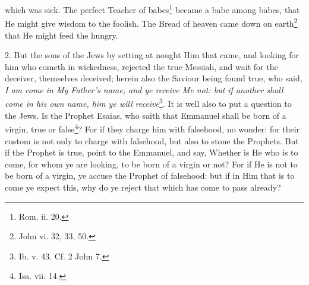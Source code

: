 which was sick. The perfect Teacher of babes\footnote{Rom. ii. 20.} became a babe among babes, that He might give wisdom to the foolish. The Bread of heaven came down on earth\footnote{John vi. 32, 33, 50.} that He might feed the hungry.

2. But the sons of the Jews by setting at nought Him that came, and looking for him who cometh in wickedness, rejected the true Messiah, and wait for the deceiver, themselves deceived; herein also the Saviour being found true, who said, \emph{I am come in My Father’s name, and ye receive Me not: but if another shall come in his own name, him ye will receive}\footnote{Ib. v. 43. Cf. 2 John 7.}. It is well also to put a question to the Jews. Is the Prophet Esaias, who saith that Emmanuel shall be born of a virgin, true or false\footnote{Isa. vii. 14.}? For if they charge him with falsehood, no wonder: for their custom is not only to charge with falsehood, but also to stone the Prophets. But if the Prophet is true, point to the Emmanuel, and say, Whether is He who is to come, for whom ye are looking, to be born of a virgin or not? For if He is not to be born of a virgin, ye accuse the Prophet of falsehood: but if in Him that is to come ye expect this, why do ye reject that which has come to pass already?

